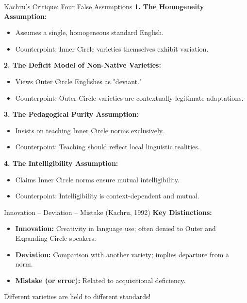 \documentclass{beamer}
\begin{document}
\begin{frame}{Kachru's Critique: Four False Assumptions}
\textbf{1. The Homogeneity Assumption:}
\begin{itemize}
    \item Assumes a single, homogeneous standard English.
    \item Counterpoint: Inner Circle varieties themselves exhibit variation.
\end{itemize}

\textbf{2. The Deficit Model of Non-Native Varieties:}
\begin{itemize}
    \item Views Outer Circle Englishes as "deviant."
    \item Counterpoint: Outer Circle varieties are contextually legitimate adaptations.
\end{itemize}

\textbf{3. The Pedagogical Purity Assumption:}
\begin{itemize}
    \item Insists on teaching Inner Circle norms exclusively.
    \item Counterpoint: Teaching should reflect local linguistic realities.
\end{itemize}

\textbf{4. The Intelligibility Assumption:}
\begin{itemize}
    \item Claims Inner Circle norms ensure mutual intelligibility.
    \item Counterpoint: Intelligibility is context-dependent and mutual.
\end{itemize}
\end{frame}



\begin{frame}{Innovation – Deviation – Mistake (Kachru, 1992)}
\textbf{Key Distinctions:}
\begin{itemize}
    \item \textbf{Innovation:} Creativity in language use; often denied to Outer and Expanding Circle speakers.
    \item \textbf{Deviation:} Comparison with another variety; implies departure from a norm.
    \item \textbf{Mistake (or error):} Related to acquisitional deficiency.
    \end{itemize}

Different varieties are held to different standards!
    
\end{frame}
\end{document}
